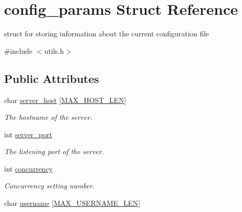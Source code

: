 \hypertarget{structconfig__params}{\section{config\-\_\-params Struct Reference}
\label{structconfig__params}
}


struct for storing information about the current configuration file  




{\ttfamily \#include $<$utils.\-h$>$}

\subsection*{Public Attributes}
\begin{DoxyCompactItemize}
\item 
\hypertarget{structconfig__params_a962b7bcdbee26333fa776115ed066fb3}{char \hyperlink{structconfig__params_a962b7bcdbee26333fa776115ed066fb3}{server\-\_\-host} \mbox{[}\hyperlink{storage_8h_aa746ad89d7f59a152f37e3529057bd58}{M\-A\-X\-\_\-\-H\-O\-S\-T\-\_\-\-L\-E\-N}\mbox{]}}\label{structconfig__params_a962b7bcdbee26333fa776115ed066fb3}

\begin{DoxyCompactList}\small\item\em The hostname of the server. \end{DoxyCompactList}\item 
\hypertarget{structconfig__params_aa7103926e2d35a5d3461a5081723bdcd}{int \hyperlink{structconfig__params_aa7103926e2d35a5d3461a5081723bdcd}{server\-\_\-port}}\label{structconfig__params_aa7103926e2d35a5d3461a5081723bdcd}

\begin{DoxyCompactList}\small\item\em The listening port of the server. \end{DoxyCompactList}\item 
\hypertarget{structconfig__params_a558fd63cba5d55cdb271c49d432a88fa}{int \hyperlink{structconfig__params_a558fd63cba5d55cdb271c49d432a88fa}{concurrency}}\label{structconfig__params_a558fd63cba5d55cdb271c49d432a88fa}

\begin{DoxyCompactList}\small\item\em Concurrency setting number. \end{DoxyCompactList}\item 
\hypertarget{structconfig__params_a4793ceaa4b04decbe50ff4fa9fdde145}{char \hyperlink{structconfig__params_a4793ceaa4b04decbe50ff4fa9fdde145}{username} \mbox{[}\hyperlink{storage_8h_a6c4647395896246d6710ba980c31666c}{M\-A\-X\-\_\-\-U\-S\-E\-R\-N\-A\-M\-E\-\_\-\-L\-E\-N}\mbox{]}}\label{structconfig__params_a4793ceaa4b04decbe50ff4fa9fdde145}


\end{DoxyCompactItemize}
